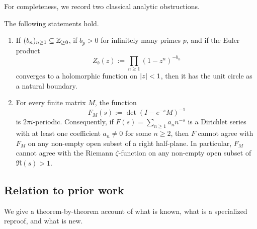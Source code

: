 For completeness, we record two classical analytic obstructions.

\begin{theorem}[Background]\label{thm:intro-analytic}
The following statements hold.
\begin{enumerate}[label=\textup{(\roman*)}]
  \item If \((b_n)_{n\ge 1}\subseteq\mathbb{Z}_{\ge 0}\), if \(b_p>0\) for
  infinitely many primes \(p\), and if the Euler product
  \[
    Z_b(z):=\prod_{n\ge 1}(1-z^n)^{-b_n}
  \]
  converges to a holomorphic function on \(\lvert z \rvert<1\), then it has the
  unit circle as a natural boundary.

  \item For every finite matrix \(M\), the function
  \[
    F_M(s):=\det(I-e^{-s}M)^{-1}
  \]
  is \(2\pi i\)-periodic. Consequently, if \(F(s)=\sum_{n\ge 1}a_n n^{-s}\)
  is a Dirichlet series with at least one coefficient \(a_n\neq 0\) for
  some \(n\ge 2\), then \(F\) cannot agree with \(F_M\) on any non-empty
  open subset of a right half-plane. In particular, \(F_M\) cannot agree
  with the Riemann \(\zeta\)-function on any non-empty open subset of
  \(\Re(s)>1\).
\end{enumerate}
\end{theorem}

\subsection{Relation to prior work}\label{subsec:prior-work}

We give a theorem-by-theorem account of what is known, what is a
specialized reproof, and what is new.

